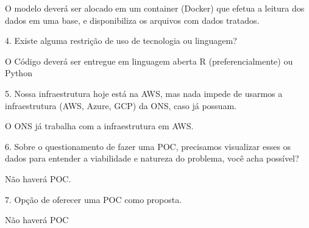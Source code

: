 \documentclass[a4paper, 12pt]{report}
\begin{document}
O modelo deverá ser alocado em um container (Docker) que efetua a leitura dos dados em uma base, e disponibiliza os arquivos com dados tratados.
\vspace{.2cm}

4. Existe alguma restrição de uso de tecnologia ou linguagem?
\vspace{.2cm}

O Código deverá ser entregue em linguagem aberta R (preferencialmente) ou Python
\vspace{.2cm}

5. Nossa infraestrutura hoje está na AWS, mas nada impede de usarmos a infraestrutura (AWS, Azure, GCP) da ONS, caso já possuam.
\vspace{.2cm}

O ONS já trabalha com a infraestrutura em AWS.
\vspace{.2cm}

6. Sobre o questionamento de fazer uma POC, precisamos visualizar esses os dados para entender a viabilidade e natureza do problema, você acha possível?
\vspace{.2cm}

Não haverá POC.
\vspace{.2cm}

7. Opção de oferecer uma POC como proposta.
\vspace{.2cm}

Não haverá POC




\end{document}
